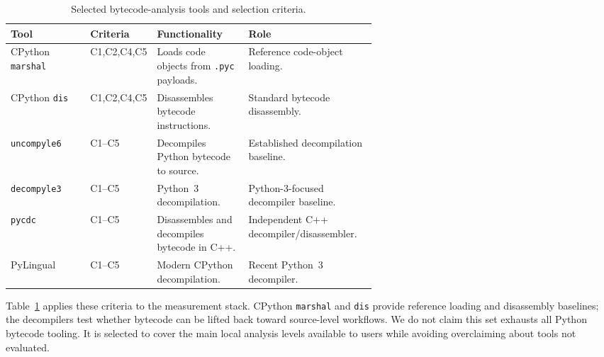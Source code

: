 \begin{table}[t]
  \centering
  \caption{Selected bytecode-analysis tools and selection criteria.}
  \label{tab:tool-selection}
  \begin{tabular}{@{}llp{0.25\linewidth}p{0.35\linewidth}@{}}
    \toprule
    Tool & Criteria & Functionality & Role \\
    \midrule
    CPython \texttt{marshal}~\cite{python-marshal} & C1,C2,C4,C5 & Loads code objects from \texttt{.pyc} payloads. & Reference code-object loading. \\
    CPython \texttt{dis}~\cite{python-dis} & C1,C2,C4,C5 & Disassembles bytecode instructions. & Standard bytecode disassembly. \\
    \texttt{uncompyle6}~\cite{uncompyle6} & C1--C5 & Decompiles Python bytecode to source. & Established decompilation baseline. \\
    \texttt{decompyle3}~\cite{decompyle3} & C1--C5 & Python~3 decompilation. & Python-3-focused decompiler baseline. \\
    \texttt{pycdc}~\cite{pycdc} & C1--C5 & Disassembles and decompiles bytecode in C++. & Independent C++ decompiler/disassembler. \\
    PyLingual~\cite{pylingual} & C1--C5 & Modern CPython decompilation. & Recent Python~3 decompiler. \\
    \bottomrule
  \end{tabular}
\end{table}

Table~\ref{tab:tool-selection} applies these criteria to the measurement stack.  CPython \texttt{marshal} and \texttt{dis} provide reference loading and disassembly baselines; the decompilers test whether bytecode can be lifted back toward source-level workflows.  We do not claim this set exhausts all Python bytecode tooling.  It is selected to cover the main local analysis levels available to users while avoiding overclaiming about tools not evaluated.
